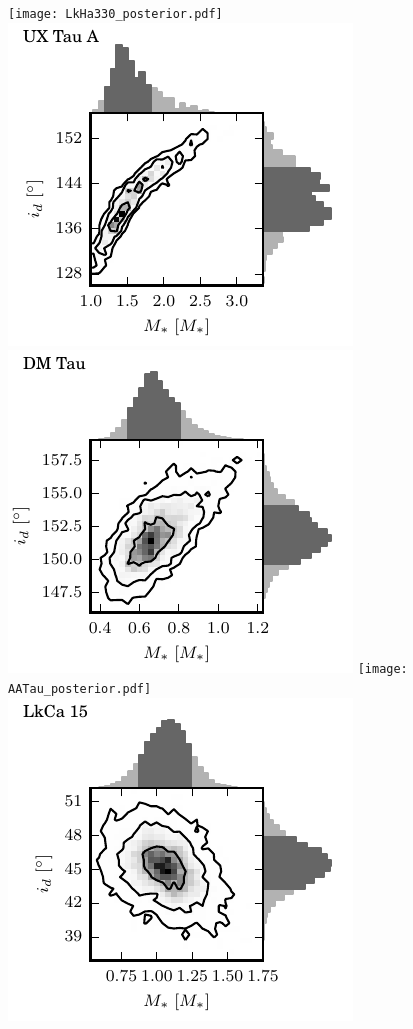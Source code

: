 \documentclass{aastex6}
\begin{document}
\begin{figure}[htb]
\begin{center}
\texttt{[image: LkHa330\_posterior.pdf]}
\includegraphics{UXTauA_posterior.pdf}
\includegraphics{DMTau_posterior.pdf}
\texttt{[image: AATau\_posterior.pdf]}
\includegraphics{LkCa15_posterior.pdf}

\end{center}
\end{figure}
\end{document}
